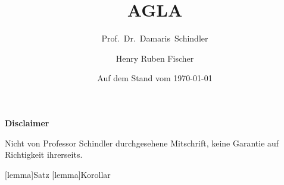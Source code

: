 \documentclass[numberindividually, numberwithin=section, empheqoverload,filemanagement]{hrflecture}
\title{AGLA \texorpdfstring{\Romannum{2}}{2}}
\subtitle{Prof.~Dr.~Damaris~Schindler}
\date{Auf dem Stand vom \today}
\author{Henry Ruben Fischer}
\begin{document}
\maketitle

\newpage
\textbf{Disclaimer}
\vspace{1cm}

Nicht von Professor Schindler durchgesehene Mitschrift, keine Garantie auf Richtigkeit ihrerseits.

\tableofcontents
\listoflectures
\listoffiles


\makeatletter
{}[lemma]{Satz}
[lemma]{Korollar}
\makeatother

























\end{document}
